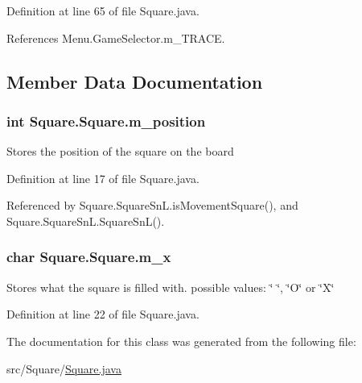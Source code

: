 Definition at line 65 of file Square.\+java.



References Menu.\+Game\+Selector.\+m\+\_\+\+T\+R\+A\+C\+E.



\subsection{Member Data Documentation}
\hypertarget{class_square_1_1_square_a459ef3208bfff1bc1a693a335c2cd5e5}{}
\subsubsection[{m\+\_\+position}]{\setlength{\rightskip}{0pt plus 5cm}int Square.\+Square.\+m\+\_\+position\hspace{0.3cm}{\ttfamily [protected]}}\label{class_square_1_1_square_a459ef3208bfff1bc1a693a335c2cd5e5}
Stores the position of the square on the board 

Definition at line 17 of file Square.\+java.



Referenced by Square.\+Square\+Sn\+L.\+is\+Movement\+Square(), and Square.\+Square\+Sn\+L.\+Square\+Sn\+L().

\hypertarget{class_square_1_1_square_a9e0779af7f8cbe54b28f95bb4a5d165a}{}
\subsubsection[{m\+\_\+x}]{\setlength{\rightskip}{0pt plus 5cm}char Square.\+Square.\+m\+\_\+x\hspace{0.3cm}{\ttfamily [protected]}}\label{class_square_1_1_square_a9e0779af7f8cbe54b28f95bb4a5d165a}
Stores what the square is filled with. possible values\+: \char`\"{} \char`\"{}, \char`\"{}\+O\char`\"{} or \char`\"{}\+X\char`\"{} 

Definition at line 22 of file Square.\+java.



The documentation for this class was generated from the following file\+:\begin{DoxyCompactItemize}
\item 
src/\+Square/\hyperlink{_square_8java}{Square.\+java}\end{DoxyCompactItemize}
